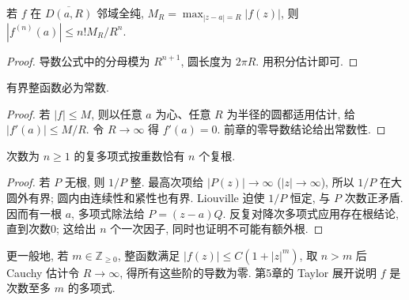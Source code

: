 \begin{corollary}[Cauchy 估计]\label{cor:cauchyestimate}
若 $f$ 在 $\overline{D(a,R)}$ 邻域全纯, $M_R=\max_{|z-a|=R}|f(z)|$, 则 $|f^{(n)}(a)|\le n!M_R/R^n$.
\end{corollary}
\begin{proof}
导数公式中的分母模为 $R^{n+1}$, 圆长度为 $2\pi R$. 用积分估计即可.
\end{proof}
\begin{theorem}[Liouville]
有界整函数必为常数.
\end{theorem}
\begin{proof}
若 $|f|\le M$, 则以任意 $a$ 为心、任意 $R$ 为半径的圆都适用估计, 给 $|f'(a)|\le M/R$. 令 $R\to\infty$ 得 $f'(a)=0$. 前章的零导数结论给出常数性.
\end{proof}
\begin{corollary}[代数基本定理]
次数为 $n\ge1$ 的复多项式按重数恰有 $n$ 个复根.
\end{corollary}
\begin{proof}
若 $P$ 无根, 则 $1/P$ 整. 最高次项给 $|P(z)|\to\infty$ ($|z|\to\infty$), 所以 $1/P$ 在大圆外有界; 圆内由连续性和紧性也有界. Liouville 迫使 $1/P$ 恒定, 与 $P$ 次数正矛盾. 因而有一根 $a$, 多项式除法给 $P=(z-a)Q$. 反复对降次多项式应用存在根结论, 直到次数0; 这给出 $n$ 个一次因子, 同时也证明不可能有额外根.
\end{proof}
更一般地, 若 $m\in\mathbb Z_{\ge0}$, 整函数满足 $|f(z)|\le C(1+|z|^m)$, 取 $n>m$ 后 Cauchy 估计令 $R\to\infty$, 得所有这些阶的导数为零. 第5章的 Taylor 展开说明 $f$ 是次数至多 $m$ 的多项式.

